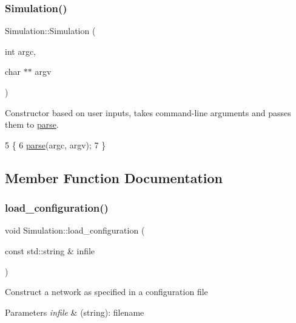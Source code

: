 \subsubsection{\texorpdfstring{Simulation()}{Simulation()}\hspace{0.1cm}{\footnotesize\ttfamily [2/2]}}
{\footnotesize\ttfamily Simulation\+::\+Simulation (\begin{DoxyParamCaption}\item[{int}]{argc,  }\item[{char $\ast$$\ast$}]{argv }\end{DoxyParamCaption})}

Constructor based on user inputs, takes command-\/line arguments and passes them to \hyperlink{classSimulation_a8f71691f59f56fcb86fa49281c2841db}{parse}. 
\begin{DoxyCode}
5                                             \{
6     \hyperlink{classSimulation_a8f71691f59f56fcb86fa49281c2841db}{parse}(argc, argv);
7 \}
\end{DoxyCode}


\subsection{Member Function Documentation}
\mbox{\label{classSimulation_acd6ce915b07465d9aaaa5fdcbb5ae077}} 
\subsubsection{\texorpdfstring{load\+\_\+configuration()}{load\_configuration()}}
{\footnotesize\ttfamily void Simulation\+::load\+\_\+configuration (\begin{DoxyParamCaption}\item[{const std\+::string \&}]{infile }\end{DoxyParamCaption})}

Construct a network as specified in a configuration file 
\begin{DoxyParams}{Parameters}
{\em infile} & (string)\+: filename \\
\hline
\end{DoxyParams}

